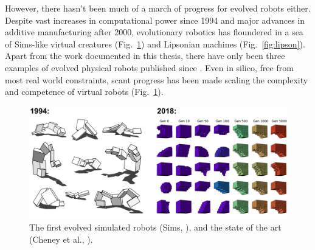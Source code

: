 However, there hasn't been much of a march of progress for evolved robots either.
Despite vast increases in computational power since 1994
and major advances in additive manufacturing after 2000,
evolutionary robotics has floundered in a sea of Sims-like virtual creatures (Fig.~\ref{fig:sims}) and Lipsonian machines (Fig.~\ref{fig:lipson}).
Apart from the work documented in this thesis,
there have only been three examples  \cite{hiller2012automatic,brodbeck2015morphological,cellucci20171d} of evolved physical
robots published since \citet{lipson2000automatic}.
Even in silico,
free from most real world constraints,
scant progress has been made scaling the complexity and competence
of virtual robots \cite{cheney2016difficulty} (Fig.~\ref{fig:sims}).


\begin{figure}
\centering
\includegraphics[width=\linewidth]{fig/virtualevorobo.pdf}
\caption{\label{fig:sims}%
The first evolved simulated robots (Sims, \cite{sims1994evolving}), and the state of the art (Cheney et al., \cite{cheney2018scalable}).
}
\end{figure}





